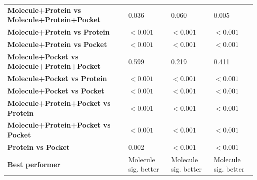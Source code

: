 \begin{table}[H]
{\begin{tabular}{llll}
        \textbf{Molecule+Protein vs Molecule+Protein+Pocket} & 0.036 & 0.060 & 0.005 \\
        \textbf{Molecule+Protein vs Protein} & $< 0.001$ & $< 0.001$ & $< 0.001$ \\
        \textbf{Molecule+Protein vs Pocket} & $< 0.001$ & $< 0.001$ & $< 0.001$ \\
        \textbf{Molecule+Pocket vs Molecule+Protein+Pocket} & 0.599 & 0.219 & 0.411 \\
        \textbf{Molecule+Pocket vs Protein} & $< 0.001$ & $< 0.001$ & $< 0.001$ \\
        \textbf{Molecule+Pocket vs Pocket} & $< 0.001$ & $< 0.001$ & $< 0.001$ \\
        \textbf{Molecule+Protein+Pocket vs Protein} & $< 0.001$ & $< 0.001$ & $< 0.001$ \\
        \textbf{Molecule+Protein+Pocket vs Pocket} & $< 0.001$ & $< 0.001$ & $< 0.001$ \\
        \textbf{Protein vs Pocket} & 0.002 & $< 0.001$ & $< 0.001$ \\
        \textbf{Best performer} & Molecule sig. better & Molecule sig. better & Molecule sig. better \\
        \bottomrule
    \end{tabular}}
\end{table}